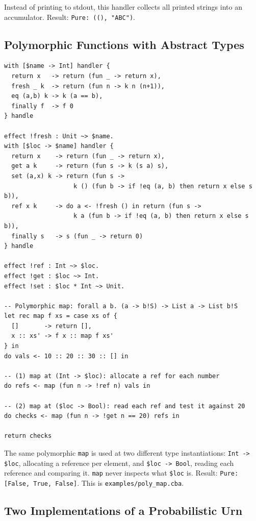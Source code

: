 \documentclass[11pt,a4paper]{article}
\begin{document}
Instead of printing to stdout, this handler collects all printed strings into
an accumulator.  Result: \texttt{Pure: ((), "ABC")}.

\subsection{Polymorphic Functions with Abstract Types}

\begin{lstlisting}
with [$name -> Int] handler {
  return x   -> return (fun _ -> return x),
  fresh _ k  -> return (fun n -> k n (n+1)),
  eq (a,b) k -> k (a == b),
  finally f  -> f 0
} handle

effect !fresh : Unit ~> $name.
with [$loc -> $name] handler {
  return x    -> return (fun _ -> return x),
  get a k     -> return (fun s -> k (s a) s),
  set (a,x) k -> return (fun s ->
                   k () (fun b -> if !eq (a, b) then return x else s b)),
  ref x k     -> do a <- !fresh () in return (fun s ->
                   k a (fun b -> if !eq (a, b) then return x else s b)),
  finally s   -> s (fun _ -> return 0)
} handle

effect !ref : Int ~> $loc.
effect !get : $loc ~> Int.
effect !set : $loc * Int ~> Unit.

-- Polymorphic map: forall a b. (a -> b!S) -> List a -> List b!S
let rec map f xs = case xs of {
  []       -> return [],
  x :: xs' -> f x :: map f xs'
} in
do vals <- 10 :: 20 :: 30 :: [] in

-- (1) map at (Int -> $loc): allocate a ref for each number
do refs <- map (fun n -> !ref n) vals in

-- (2) map at ($loc -> Bool): read each ref and test it against 20
do checks <- map (fun n -> !get n == 20) refs in

return checks
\end{lstlisting}

The same polymorphic \texttt{map} is used at two different type
instantiations: \texttt{Int -> \$loc}, allocating a reference per element,
and \texttt{\$loc -> Bool}, reading each reference and comparing it.
\texttt{map} never inspects what \texttt{\$loc} is.  Result:
\texttt{Pure: [False, True, False]}.  This is
\texttt{examples/poly\_map.cba}.

\subsection{Two Implementations of a Probabilistic Urn}
\end{document}
